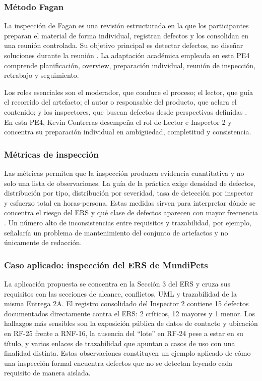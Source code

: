 \documentclass[journal,onecolumn]{IEEEtran}
\begin{document}
	\subsubsection{Método Fagan}
	
	La inspección de Fagan es una revisión estructurada en la que los participantes preparan el
	material de forma individual, registran defectos y los consolidan en una reunión controlada. Su
	objetivo principal es detectar defectos, no diseñar soluciones durante la reunión
	\cite{fagan1976}. La adaptación académica empleada en esta PE4 comprende planificación, overview,
	preparación individual, reunión de inspección, retrabajo y seguimiento.
	
	Los roles esenciales son el moderador, que conduce el proceso; el lector, que guía el recorrido
	del artefacto; el autor o responsable del producto, que aclara el contenido; y los inspectores,
	que buscan defectos desde perspectivas definidas \cite{fagan1976}. En esta PE4, Kevin Contreras
	desempeña el rol de Lector e Inspector 2 y concentra su preparación individual en ambigüedad,
	completitud y consistencia.
	
	\subsubsection{Métricas de inspección}
	
	Las métricas permiten que la inspección produzca evidencia cuantitativa y no solo una lista de
	observaciones. La guía de la práctica exige densidad de defectos, distribución por tipo,
	distribución por severidad, tasa de detección por inspector y esfuerzo total en horas-persona.
	Estas medidas sirven para interpretar dónde se concentra el riesgo del ERS y qué clase de defectos
	aparecen con mayor frecuencia \cite{wiegers2013}. Un número alto de inconsistencias entre
	requisitos y trazabilidad, por ejemplo, señalaría un problema de mantenimiento del conjunto de
	artefactos y no únicamente de redacción.
	
	\subsubsection{Caso aplicado: inspección del ERS de MundiPets}
	
	La aplicación propuesta se concentra en la Sección 3 del ERS y cruza sus requisitos con las
	secciones de alcance, conflictos, UML y trazabilidad de la misma Entrega 2A. El registro
	consolidado del Inspector 2 contiene 15 defectos documentados directamente contra el ERS: 2
	críticos, 12 mayores y 1 menor. Los hallazgos más sensibles son la exposición pública de datos de
	contacto y ubicación en RF-25 frente a RNF-16, la ausencia del ``lote'' en RF-24 pese a estar en
	su título, y varios enlaces de trazabilidad que apuntan a casos de uso con una finalidad distinta.
	Estas observaciones constituyen un ejemplo aplicado de cómo una inspección formal encuentra
	defectos que no se detectan leyendo cada requisito de manera aislada.
	
\end{document}
